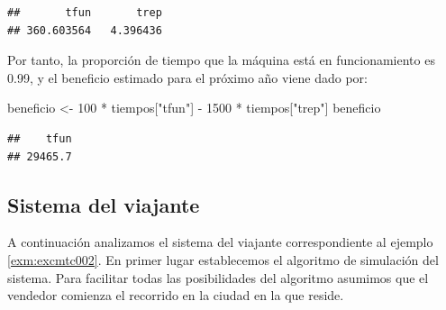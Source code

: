 \documentclass[
]{book}
\newenvironment{Shaded}{\begin{snugshade}}{\end{snugshade}}
\newcommand{\DecValTok}[1]{\textcolor[rgb]{0.00,0.00,0.81}{#1}}
\newcommand{\NormalTok}[1]{#1}
\newcommand{\OtherTok}[1]{\textcolor[rgb]{0.56,0.35,0.01}{#1}}
\newcommand{\SpecialCharTok}[1]{\textcolor[rgb]{0.00,0.00,0.00}{#1}}
\newcommand{\StringTok}[1]{\textcolor[rgb]{0.31,0.60,0.02}{#1}}
\theoremstyle{definition}
\theoremstyle{definition}
\theoremstyle{definition}
\theoremstyle{definition}
\theoremstyle{remark}
\begin{document}
\begin{verbatim}
##       tfun       trep 
## 360.603564   4.396436
\end{verbatim}

Por tanto, la proporción de tiempo que la máquina está en funcionamiento es 0.99, y el beneficio estimado para el próximo año viene dado por:

\begin{Shaded}
\begin{Highlighting}[]
\NormalTok{beneficio }\OtherTok{\textless{}{-}} \DecValTok{100} \SpecialCharTok{*}\NormalTok{ tiempos[}\StringTok{"tfun"}\NormalTok{] }\SpecialCharTok{{-}} \DecValTok{1500} \SpecialCharTok{*}\NormalTok{ tiempos[}\StringTok{"trep"}\NormalTok{]}
\NormalTok{beneficio}
\end{Highlighting}
\end{Shaded}

\begin{verbatim}
##    tfun 
## 29465.7
\end{verbatim}

\hypertarget{sistema-del-viajante}{%
\subsection{Sistema del viajante}\label{sistema-del-viajante}}

A continuación analizamos el sistema del viajante correspondiente al ejemplo \ref{exm:excmtc002}. En primer lugar establecemos el algoritmo de simulación del sistema. Para facilitar todas las posibilidades del algoritmo asumimos que el vendedor comienza el recorrido en la ciudad en la que reside.
\end{document}
